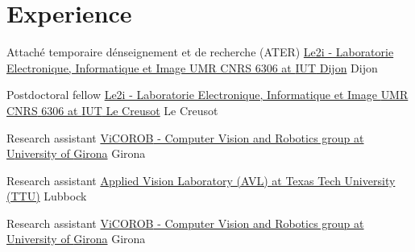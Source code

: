 
\section{Experience}

{Attach\'{e} temporaire d\'enseignement et de recherche (ATER)}
{\href{http://le2i.cnrs.fr/?lang=en}{Le2i - Laboratorie Electronique, Informatique et Image {UMR CNRS} 6306 at {IUT} Dijon}}
{}
{Dijon}
{}

{Postdoctoral fellow}
{\href{http://le2i.cnrs.fr/?lang=en}{Le2i - Laboratorie Electronique, Informatique et Image {UMR CNRS} 6306 at {IUT} Le Creusot}}
{}
{Le Creusot}
{}

{Research assistant}
{\href{http://vicorob.udg.edu}{{ViCOROB} - Computer Vision and Robotics group at {U}niversity of {G}irona}}
{}
{Girona}
{}

{Research assistant}
{\href{http://www.depts.ttu.edu/ece/groups/appliedvision/}{Applied Vision Laboratory (AVL) at Texas Tech University (TTU)}}
{}
{Lubbock}
{}

{Research assistant}
{\href{http://vicorob.udg.edu}{{ViCOROB} - Computer Vision and Robotics group at {U}niversity of {G}irona}}
{}
{Girona}
{}


